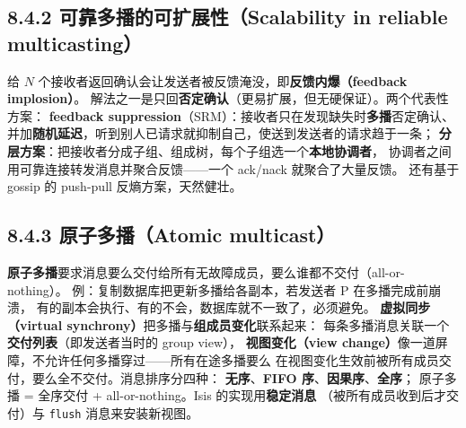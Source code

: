 \begin{closeread}
\end{closeread}


\subsection*{8.4.2 可靠多播的可扩展性（Scalability in reliable multicasting）}
给 $N$ 个接收者返回确认会让发送者被反馈淹没，即\textbf{反馈内爆（feedback implosion）}。
解法之一是只回\textbf{否定确认}（更易扩展，但无硬保证）。两个代表性方案：
\textbf{feedback suppression}（SRM）：接收者只在发现缺失时\textbf{多播}否定确认、
并加\textbf{随机延迟}，听到别人已请求就抑制自己，使送到发送者的请求趋于一条；
\textbf{分层方案}：把接收者分成子组、组成树，每个子组选一个\textbf{本地协调者}，
协调者之间用可靠连接转发消息并聚合反馈——一个 ack/nack 就聚合了大量反馈。
还有基于 gossip 的 push-pull 反熵方案，天然健壮。

\begin{closeread}
\end{closeread}


\subsection*{8.4.3 原子多播（Atomic multicast）}
\textbf{原子多播}要求消息要么交付给所有无故障成员，要么谁都不交付（all-or-nothing）。
例：复制数据库把更新多播给各副本，若发送者 P 在多播完成前崩溃，
有的副本会执行、有的不会，数据库就不一致了，必须避免。
\textbf{虚拟同步（virtual synchrony）}把多播与\textbf{组成员变化}联系起来：
每条多播消息关联一个\textbf{交付列表}（即发送者当时的 group view），
\textbf{视图变化（view change）}像一道屏障，不允许任何多播穿过——所有在途多播要么
在视图变化生效前被所有成员交付，要么全不交付。消息排序分四种：
\textbf{无序}、\textbf{FIFO 序}、\textbf{因果序}、\textbf{全序}；
原子多播 = 全序交付 + all-or-nothing。Isis 的实现用\textbf{稳定消息}
（被所有成员收到后才交付）与 \texttt{flush} 消息来安装新视图。

